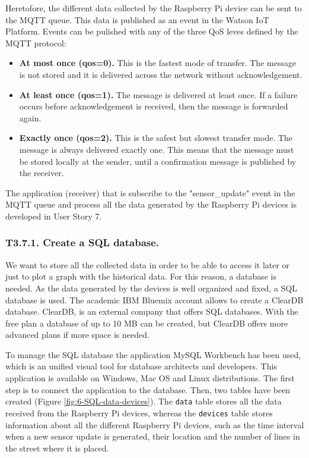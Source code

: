 Heretofore, the different data collected by the Raspberry Pi device can be sent to the MQTT queue. This data is published as an event in the Watson \ac{IoT} Platform. Events can be pulished with any of the three \ac{QoS} leves defined by the MQTT protocol:
\begin{itemize}
	\item \textbf{At most once (qos=0).} This is the fastest mode of transfer. The message is not stored and it is delivered across the network without acknowledgement.
	\item \textbf{At least once (qos=1).} The message is delivered at least once. If a failure occurs before acknowledgement is received, then the message is forwarded again.
	\item \textbf{Exactly once (qos=2).} This is the safest but slowest transfer mode. The message is always delivered exactly one. This means that the message must be stored locally at the sender, until a confirmation message is published by the receiver.
\end{itemize}

The application (receiver) that is subscribe to the "sensor\_update" event in the MQTT queue and process all the data generated by the Raspberry Pi devices is developed in User Story 7.


\subsubsection{T3.7.1. Create a SQL database.}

We want to store all the collected data in order to be able to access it later or just to plot a graph with the historical data. For this reason, a database is needed. As the data generated by the devices is well organized and fixed, a SQL database is used. The academic IBM Bluemix account allows to create a ClearDB database. ClearDB, is an external company that offers SQL databases. With the free plan a database of up to 10 MB can be created, but ClearDB offers more advanced plans if more space is needed.

To manage the SQL database the application MySQL Workbench has been used, which is an unified visual tool for database architects and developers. This application is available on Windows, Mac OS and Linux distributions. The first step is to connect the application to the database. Then, two tables have been created (Figure \ref{fig:6-SQL-data-devices}). The \texttt{data} table stores all the data received from the Raspberry Pi devices, whereas the \texttt{devices} table stores information about all the different Raspberry Pi devices, such as the time interval when a new sensor update is generated, their location and the number of lines in the street where it is placed.

